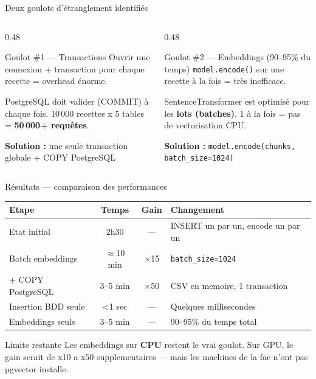 \documentclass[aspectratio=169]{beamer}
\begin{document}
\begin{frame}{Deux goulots d'\'etranglement identifi\'es}
\begin{columns}[T]
\begin{column}{0.48\textwidth}
  \begin{alertblock}{Goulot \#1 --- Transactions}
  \footnotesize
  Ouvrir une connexion + transaction pour chaque recette = overhead \'enorme.

  \smallskip
  PostgreSQL doit valider (COMMIT) \`a chaque fois. 10\,000 recettes x 5 tables = \textbf{50\,000+ requ\^etes}.

  \smallskip
  \textbf{Solution :} une seule transaction globale + COPY PostgreSQL
  \end{alertblock}
\end{column}
\begin{column}{0.48\textwidth}
  \begin{alertblock}{Goulot \#2 --- Embeddings (90--95\% du temps)}
  \footnotesize
  \texttt{model.encode()} sur une recette \`a la fois = tr\`es inefficace.

  \smallskip
  SentenceTransformer est optimis\'e pour les \textbf{lots (batches)}. 1 \`a la fois = pas de vectorisation CPU.

  \smallskip
  \textbf{Solution :} \texttt{model.encode(chunks, batch\_size=1024)}
  \end{alertblock}
\end{column}
\end{columns}
\end{frame}



\begin{frame}{R\'esultats --- comparaison des performances}
\begin{center}
\renewcommand{\arraystretch}{1.4}
\begin{tabular}{lccl}
\toprule
\textbf{Etape} & \textbf{Temps} & \textbf{Gain} & \textbf{Changement} \\
\midrule
\rowcolor{corange!20}
Etat initial & 2h30 & --- & INSERT un par un, encode un par un \\
\rowcolor{cyellow!30}
Batch embeddings & $\approx$10 min & $\times$15 & \texttt{batch\_size=1024} \\
\rowcolor{cgreen!20}
+ COPY PostgreSQL & 3--5 min & $\times$50 & CSV en memoire, 1 transaction \\
\midrule
\rowcolor{cprimary!10}
Insertion BDD seule & <1 sec & --- & Quelques millisecondes \\
Embeddings seuls & 3--5 min & --- & 90--95\% du temps total \\
\bottomrule
\end{tabular}
\end{center}

\vspace{0.4cm}
\begin{block}{Limite restante}
\footnotesize
Les embeddings sur \textbf{CPU} restent le vrai goulot. Sur GPU, le gain serait de x10 a x50 supplementaires --- mais les machines de la fac n'ont pas pgvector installe.
\end{block}
\end{frame}
\end{document}
